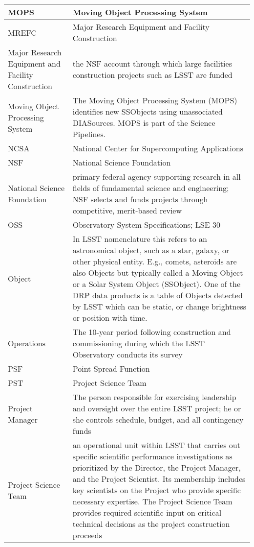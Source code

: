\begin{longtable}{|l|p{}|}
MOPS & \gls{Moving Object Processing System} \\\hline
MREFC & Major Research Equipment and Facility \gls{Construction} \\\hline
Major Research Equipment and Facility \gls{Construction} & the \gls{NSF} account through which large facilities construction projects such as \gls{LSST} are funded \\\hline
Moving Object Processing System & The \gls{Moving Object Processing System} (\gls{MOPS}) identifies new SSObjects using unassociated DIASources. \gls{MOPS} is part of the \gls{Science Pipelines}. \\\hline
NCSA & National \gls{Center} for Supercomputing Applications \\\hline
NSF & \gls{National Science Foundation} \\\hline
National Science Foundation & primary federal agency supporting research in all fields of fundamental science and engineering; \gls{NSF} selects and funds projects through competitive, merit-based review \\\hline
OSS & Observatory System Specifications; \gls{LSE}-30 \\\hline
Object & In \gls{LSST} nomenclature this refers to an \gls{astronomical object}, such as a star, galaxy, or other physical entity. E.g., comets, asteroids are also Objects but typically called a Moving Object or a \gls{Solar System Object} (SSObject). One of the \gls{DRP} data products is a table of Objects detected by \gls{LSST} which can be static, or change brightness or position with time. \\\hline
Operations & The 10-year period following construction and commissioning during which the \gls{LSST} Observatory conducts its survey \\\hline
PSF & Point Spread Function \\\hline
PST & \gls{Project Science Team} \\\hline
Project Manager & The person responsible for exercising leadership and oversight over the entire \gls{LSST} project; he or she controls schedule, budget, and all contingency funds \\\hline
Project Science Team & an operational unit within \gls{LSST} that carries out specific scientific performance investigations as prioritized by the \gls{Director}, the \gls{Project Manager}, and the \gls{Project Scientist}. Its membership includes key scientists on the Project who provide specific necessary expertise. The \gls{Project Science Team} provides required scientific input on critical technical decisions as the project construction proceeds \\\hline

\end{longtable}
